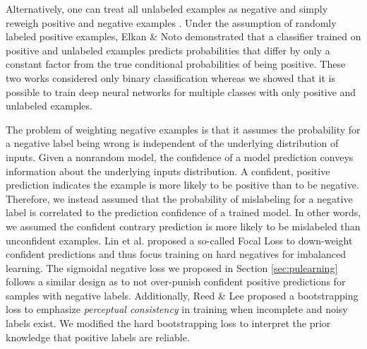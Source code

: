 Alternatively, one can treat all unlabeled examples as negative and simply reweigh positive and negative examples \cite{lee2003learning}.
Under the assumption of randomly labeled positive examples, Elkan \& Noto \cite{elkan2008learning} demonstrated that a classifier trained on positive and unlabeled examples predicts probabilities that differ by only a constant factor from the true conditional probabilities of being positive.
These two works considered only binary classification whereas we showed that it is possible to train deep neural networks for multiple classes with only positive and unlabeled examples.

The problem of weighting negative examples is that it assumes the probability for a negative label being wrong is independent of the underlying distribution of inputs.
Given a nonrandom model, the confidence of a model prediction conveys information about the underlying inputs distribution.
A confident, positive prediction indicates the example is more likely to be positive than to be negative.
Therefore, we instead assumed that the probability of mislabeling for a negative label is correlated to the prediction confidence of a trained model.
In other words, we assumed the confident contrary prediction is more likely to be mislabeled than unconfident examples.
Lin et al. \cite{lin2017focal} proposed a so-called Focal Loss to down-weight confident predictions and thus focus training on hard negatives for imbalanced learning.
The sigmoidal negative loss we proposed in Section \ref{sec:pulearning} follows a similar design as  \cite{lin2017focal} to not over-punish confident positive predictions for samples with negative labels.
Additionally, Reed \& Lee \cite{reed2014training} proposed a bootstrapping loss to emphasize \textit{perceptual consistency} in training when incomplete and noisy labels exist.
We modified the hard bootstrapping loss to interpret the prior knowledge that positive labels are reliable.
